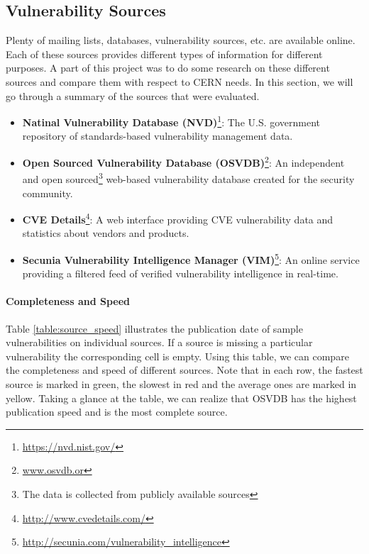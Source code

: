 \subsection{Vulnerability Sources}
\label{vuln_sources}
Plenty of mailing lists, databases, vulnerability sources, etc. are available online. Each of these sources provides different types of information for different purposes. A part of this project was to do some research on these different sources and compare them with respect to CERN needs. In this section, we will go through a summary of the sources that were evaluated. 
\begin{itemize}
\item \textbf{Natinal Vulnerability Database (NVD)}\footnote{\url{https://nvd.nist.gov/}}: The U.S. government repository of standards-based vulnerability management data.
\item \textbf{Open Sourced Vulnerability Database (OSVDB)}\footnote{\url{www.osvdb.or}}: An independent and open sourced\footnote{The data is collected from publicly available sources} web-based vulnerability database created for the security community. 
\item \textbf{CVE Details}\footnote{\url{http://www.cvedetails.com/}}: A web interface providing CVE vulnerability data and statistics about vendors and products.
\item \textbf{Secunia Vulnerability Intelligence Manager (VIM)}\footnote{\url{http://secunia.com/vulnerability_intelligence}}: An online service providing a filtered feed of verified vulnerability intelligence in real-time.

\end{itemize}
\paragraph{Completeness and Speed}
Table \ref{table:source_speed} illustrates the publication date of sample vulnerabilities on individual sources. If a source is missing a particular vulnerability the corresponding cell is empty. Using this table, we can compare the completeness and speed of different sources. Note that in each row, the fastest source is marked in green, the slowest in red and the average ones are marked in yellow. Taking a glance at the table, we can realize that OSVDB has the highest publication speed and is the most complete source.

